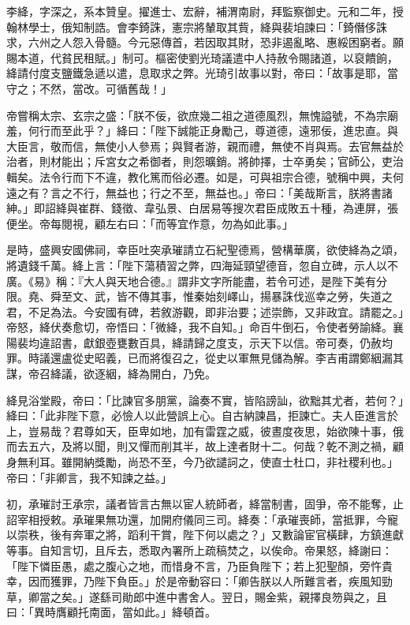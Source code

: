 \begin{pinyinscope}
 李絳，字深之，系本贊皇。擢進士、宏辭，補渭南尉，拜監察御史。元和二年，授翰林學士，俄知制誥。會李錡誅，憲宗將輦取其貲，絳與裴垍諫曰：「錡僭侈誅求，六州之人怨入骨髓。今元惡傳首，若因取其財，恐非遏亂略、惠綏困窮者。願賜本道，代貧民租賦。」制可。樞密使劉光琦議遣中人持赦令賜諸道，以裒饋餉，絳請付度支鹽鐵急遞以遣，息取求之弊。光琦引故事以對，帝曰：「故事是耶，當守之；不然，當改。可循舊哉！」



 帝嘗稱太宗、玄宗之盛：「朕不佞，欲庶幾二祖之道德風烈，無愧謚號，不為宗廟羞，何行而至此乎？」絳曰：「陛下誠能正身勵己，尊道德，遠邪佞，進忠直。與大臣言，敬而信，無使小人參焉；與賢者游，親而禮，無使不肖與焉。去官無益於治者，則材能出；斥宮女之希御者，則怨曠銷。將帥擇，士卒勇矣；官師公，吏治輯矣。法令行而下不違，教化篤而俗必遷。如是，可與祖宗合德，號稱中興，夫何遠之有？言之不行，無益也；行之不至，無益也。」帝曰：「美哉斯言，朕將書諸紳。」即詔絳與崔群、錢徵、韋弘景、白居易等搜次君臣成敗五十種，為連屏，張便坐。帝每閱視，顧左右曰：「而等宜作意，勿為如此事。」



 是時，盛興安國佛祠，幸臣吐突承璀請立石紀聖德焉，營構華廣，欲使絳為之頌，將遺錢千萬。絳上言：「陛下蕩積習之弊，四海延頸望德音，忽自立碑，示人以不廣。《易》稱：『大人與天地合德。』謂非文字所能盡，若令可述，是陛下美有分限。堯、舜至文、武，皆不傳其事，惟秦始刻嶧山，揚暴誅伐巡幸之勞，失道之君，不足為法。今安國有碑，若敘游觀，即非治要；述崇飾，又非政宜。請罷之。」帝怒，絳伏奏愈切，帝悟曰：「微絳，我不自知。」命百牛倒石，令使者勞諭絳。襄陽裴均違詔書，獻銀壺甕數百具，絳請歸之度支，示天下以信。帝可奏，仍赦均罪。時議還盧從史昭義，已而將復召之，從史以軍無見儲為解。李吉甫謂鄭絪漏其謀，帝召絳議，欲逐絪，絳為開白，乃免。



 絳見浴堂殿，帝曰：「比諫官多朋黨，論奏不實，皆陷謗訕，欲黜其尤者，若何？」絳曰：「此非陛下意，必憸人以此營誤上心。自古納諫昌，拒諫亡。夫人臣進言於上，豈易哉？君尊如天，臣卑如地，加有雷霆之威，彼晝度夜思，始欲陳十事，俄而去五六，及將以聞，則又憚而削其半，故上達者財十二。何哉？乾不測之禍，顧身無利耳。雖開納獎勵，尚恐不至，今乃欲譴訶之，使直士杜口，非社稷利也。」帝曰：「非卿言，我不知諫之益。」



 初，承璀討王承宗，議者皆言古無以宦人統師者，絳當制書，固爭，帝不能奪，止詔宰相授敕。承璀果無功還，加開府儀同三司。絳奏：「承璀喪師，當抵罪，今寵以崇秩，後有奔軍之將，蹈利干賞，陛下何以處之？」又數論宦官橫肆，方鎮進獻等事。自知言切，且斥去，悉取內署所上疏稿焚之，以俟命。帝果怒，絳謝曰：「陛下憐臣愚，處之腹心之地，而惜身不言，乃臣負陛下；若上犯聖顏，旁忤貴幸，因而獲罪，乃陛下負臣。」於是帝動容曰：「卿告朕以人所難言者，疾風知勁草，卿當之矣。」遂繇司勛郎中進中書舍人。翌日，賜金紫，親擇良笏與之，且曰：「異時膺顧托南面，當如此。」絳頓首。




\end{pinyinscope}
